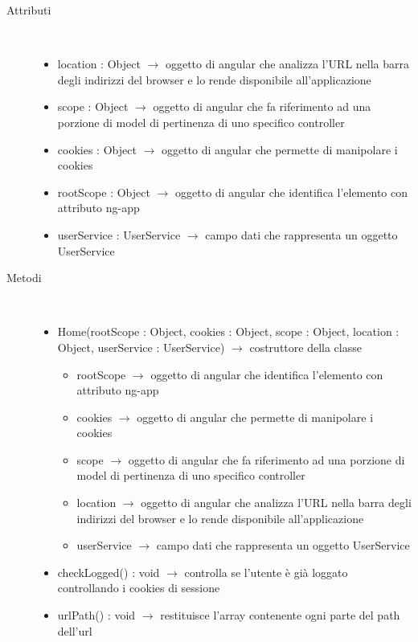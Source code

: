 \begin{description}
\item[Attributi] \hfill \\
\vspace{-7mm}
\begin{itemize}
	\item location : Object $\rightarrow$ oggetto di angular che analizza l'URL nella barra degli indirizzi del browser e lo rende disponibile all'applicazione
	\item scope : Object $\rightarrow$ oggetto di angular che fa riferimento ad una porzione di model di pertinenza di uno specifico controller
	\item cookies : Object $\rightarrow$ oggetto di angular che permette di manipolare i cookies
	\item rootScope : Object $\rightarrow$ oggetto di angular che identifica l’elemento con attributo ng-app
	\item userService : UserService $\rightarrow$ campo dati che rappresenta un oggetto UserService
\end{itemize}

\item[Metodi] \hfill \\
\vspace{-7mm}
\begin{itemize}
	\item Home(rootScope : Object, cookies : Object, scope : Object, location : Object, userService : UserService) $\rightarrow$ costruttore della classe\begin{itemize}
		\item rootScope $\rightarrow$ oggetto di angular che identifica l’elemento con attributo ng-app
		\item cookies $\rightarrow$ oggetto di angular che permette di manipolare i cookies
		\item scope $\rightarrow$ oggetto di angular che fa riferimento ad una porzione di model di pertinenza di uno specifico controller
		\item location $\rightarrow$ oggetto di angular che analizza l'URL nella barra degli indirizzi del browser e lo rende disponibile all'applicazione
		\item userService $\rightarrow$ campo dati che rappresenta un oggetto UserService
	\end{itemize}
	
	\item checkLogged() : void $\rightarrow$ controlla se l'utente è già loggato controllando i cookies di sessione
	\item urlPath() : void $\rightarrow$ restituisce l'array contenente ogni parte del path dell'url
\end{itemize}

\end{description}

